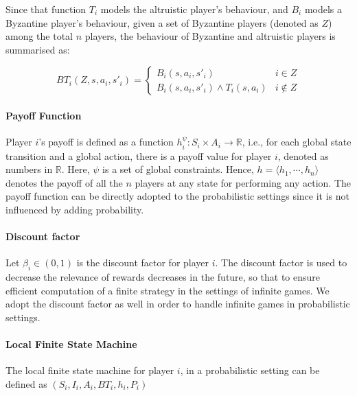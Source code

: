 Since that function $T_i$ models the altruistic player's behaviour, and $B_i$ models a Byzantine player's behaviour, given a set of  Byzantine players (denoted as $Z$) among the total $n$ players, the behaviour of Byzantine and altruistic players is summarised as:

\begin{equation*}
BT_i(Z,s,a_i,s'_i)=
\begin{cases}
B_i(s,a_i,s'_i) &  i \in Z \\
B_i(s,a_i,s'_i) \wedge T_i(s,a_i) & i \notin Z
\end{cases}	
\end{equation*}

\paragraph{Payoff Function}\cite{MMS08}

Player $i$'s payoff is defined as a function $h^{\psi}_i: S_i \times A_i \rightarrow \mathbb{R}$, i.e., for each global state transition and a global action, there is a payoff value for player $i$, denoted as numbers in $\mathbb{R}$. Here, ${\psi}$ is a set of global constraints. 
Hence, $h = \langle h_1,\cdots,h_n\rangle$ denotes the payoff of all the $n$ players at any state for performing any action.
The payoff function can be directly adopted to the probabilistic settings since it is not influenced by adding probability.

\paragraph{Discount factor}
Let $\beta_i \in (0,1)$ is the discount factor for player $i$. The discount factor is used to decrease the relevance of rewards decreases in the future, so that to ensure efficient computation of a finite strategy in the settings of infinite games. We adopt the discount factor as well in order to handle infinite games in probabilistic settings.

\paragraph{Local Finite State Machine}
The local finite state machine for player $i$, in a probabilistic setting can be defined as $(S_i, I_i, A_i, BT_i, h_i, P_i )$

